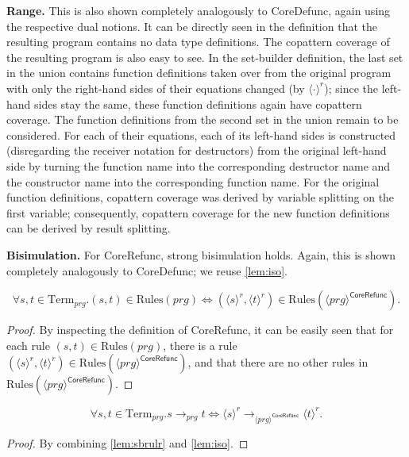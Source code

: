 \textbf{Range.} This is also shown completely analogously to \textsf{CoreDefunc}, again using the respective dual notions. It can be directly seen in the definition that the resulting program contains no data type definitions. The copattern coverage of the resulting program is also easy to see. In the set-builder definition, the last set in the union contains function definitions taken over from the original program with only the right-hand sides of their equations changed (by $\langle \cdot \rangle^r$); since the left-hand sides stay the same, these function definitions again have copattern coverage. The function definitions from the second set in the union remain to be considered. For each of their equations, each of its left-hand sides is constructed (disregarding the receiver notation for destructors) from the original left-hand side by turning the function name into the corresponding destructor name and the constructor name into the corresponding function name. For the original function definitions, copattern coverage was derived by variable splitting on the first variable; consequently, copattern coverage for the new function definitions can be derived by result splitting.

\textbf{Bisimulation.} For \textsf{CoreRefunc}, strong bisimulation holds. Again, this is shown completely analogously to \textsf{CoreDefunc}; we reuse \autoref{lem:iso}.

\begin{lemma}
\label{lem:sbrulr}
\[
\forall s,t \in \textrm{Term}_{prg}. (s, t) \in \textrm{Rules}(prg) \iff (\langle s \rangle^r, \langle t \rangle^r) \in \textrm{Rules}(\langle prg \rangle^{\textsf{CoreRefunc}}).
\]
\begin{proof}
By inspecting the definition of \textsf{CoreRefunc}, it can be easily seen that for each rule $(s, t) \in \textrm{Rules}(prg)$, there is a rule $(\langle s \rangle^r, \langle t \rangle^r) \in \textrm{Rules}(\langle prg \rangle^{\textsf{CoreRefunc}})$, and that there are no other rules in $\textrm{Rules}(\langle prg \rangle^{\textsf{CoreRefunc}})$.
\end{proof}
\end{lemma}

\begin{corollary}
\[
\forall s,t \in \textrm{Term}_{prg}. s \longrightarrow_{prg} t \iff \langle s \rangle^r \longrightarrow_{\langle prg \rangle^{\textsf{CoreRefunc}}} \langle t \rangle^r.
\]
\begin{proof}
By combining \autoref{lem:sbrulr} and \autoref{lem:iso}.
\end{proof}
\end{corollary}

